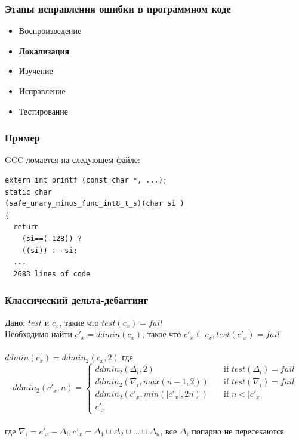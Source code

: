 


\begin{frame}
	\frametitle{Этапы исправления ошибки в программном коде}
	\begin{itemize}
		\item Воспроизведение
		\item \textbf{Локализация}
		\item Изучение
		\item Исправление
		\item Тестирование
	\end{itemize}
\end{frame}



\begin{frame}[fragile]
	\frametitle{Пример}
	GCC ломается на следующем файле:
	\begin{lstlisting}[style =crs_cpp]
extern int printf (const char *, ...);
static char
(safe_unary_minus_func_int8_t_s)(char si )
{
  return
    (si==(-128)) ?
    ((si)) : -si;
  ...
  2683 lines of code
\end{lstlisting}
\end{frame}



\begin{frame}
	\frametitle{Классический дельта-дебаггинг}
	Дано: $test$ и $c_x$, такие что $test(c_x) = fail$ \\
	Необходимо найти $c'_x = ddmin(c_x)$, такое что $c'_x \subseteq c_x, test(c'_x) = fail$ \\ \  \\ 
	$ddmin(c_x) = ddmin_2(c_x, 2)$ где \\
\[ ddmin_2(c'_x, n) =
  \begin{cases}
    ddmin_2(\Delta_i, 2)       & \quad \text{if } test(\Delta_i) = fail\\
    ddmin_2(\nabla_i, max(n - 1, 2))       & \quad \text{if } test(\nabla_i) = fail\\
    ddmin_2(c'_x, min(|c'_x|, 2n))       & \quad \text{if } n < |c'_x|\\
    c'_x
  \end{cases}
\]
\\
где $\nabla_i = c'_x - \Delta_i, c'_x = \Delta_1 \cup \Delta_2 \cup ... \cup \Delta_n$, все $\Delta_i$ попарно не пересекаются
\end{frame}


